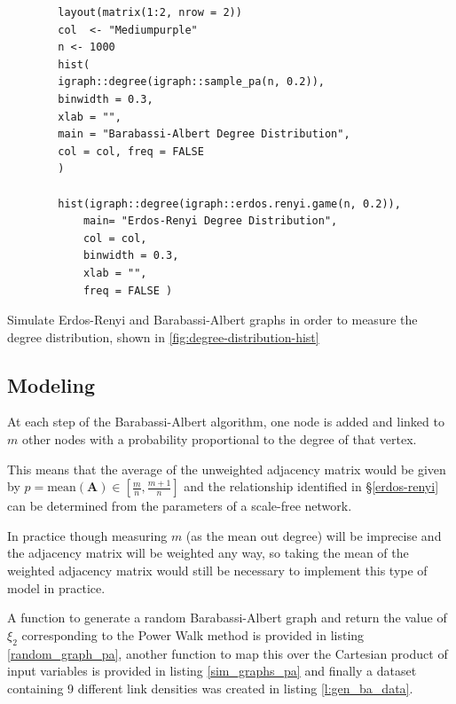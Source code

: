 \documentclass[11pt]{report}
\begin{document}


\begin{listing}[htbp]
    \begin{tcolorbox}
        \begin{verbatim}
        layout(matrix(1:2, nrow = 2))
        col  <- "Mediumpurple"
        n <- 1000
        hist(
        igraph::degree(igraph::sample_pa(n, 0.2)),
        binwidth = 0.3,
        xlab = "",
        main = "Barabassi-Albert Degree Distribution",
        col = col, freq = FALSE
        )

        hist(igraph::degree(igraph::erdos.renyi.game(n, 0.2)),
            main= "Erdos-Renyi Degree Distribution",
            col = col,
            binwidth = 0.3,
            xlab = "",
            freq = FALSE )
        \end{verbatim}
    \end{tcolorbox}
\caption{\label{degree-distribution-hist}Simulate Erdos-Renyi and Barabassi-Albert graphs in order to measure the degree distribution,  shown in \ref{fig:degree-distribution-hist}}
\end{listing}



\subsection{Modeling}
\label{sec:orgb52cc3e}
At each step of the Barabassi-Albert algorithm, one node is added and linked to \(m\) other nodes with a probability proportional to the degree of that vertex.

This means that the average of the unweighted adjacency matrix would be given by \(p = \mathrm{mean}\left(\mathbf{A}\right) \in \left[ \frac{m}{n}, \frac{m+1}{n} \right]\) and the relationship identified in  \S \ref{erdos-renyi} can be determined from the parameters of a scale-free network.

In practice though measuring \(m\) (as the mean out degree) will be imprecise and the adjacency matrix will be weighted any way, so taking the mean of the weighted adjacency matrix would still be necessary to implement this type of model in practice.

A function to generate a random Barabassi-Albert graph and return the value of
\(\xi_{2}\) corresponding to the Power Walk method is provided in listing
\ref{random_graph_pa}, another function to map this over the Cartesian product of
input variables is provided in listing \ref{sim_graphs_pa} and finally a dataset containing 9
different link densities was created in listing \ref{l:gen_ba_data}.
\end{document}
